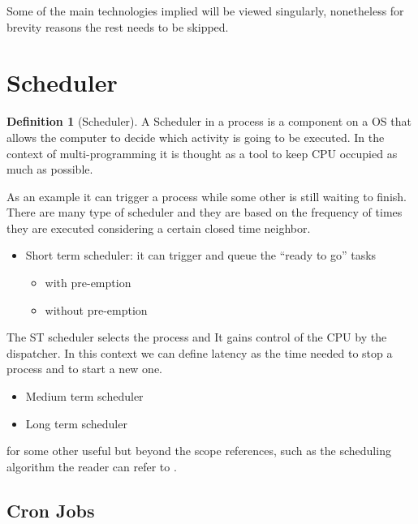\documentclass[
  12pt,
  a4paper,
  oneside]{book}
\providecommand{\tightlist}{%
  \setlength{\itemsep}{0pt}\setlength{\parskip}{0pt}}
\theoremstyle{definition}
\newtheorem{definition}{Definition}[chapter]
\theoremstyle{definition}
\theoremstyle{definition}
\theoremstyle{remark}
\begin{document}
Some of the main technologies implied will be viewed singularly, nonetheless for brevity reasons the rest needs to be skipped.

\hypertarget{scheduler}{%
\section{Scheduler}\label{scheduler}}

\begin{definition}[Scheduler]
\protect\hypertarget{def:scheduler}{}{\label{def:scheduler} {} }A Scheduler in a process is a component on a OS that allows the computer to decide which activity is going to be executed. In the context of multi-programming it is thought as a tool to keep CPU occupied as much as possible.
\end{definition}

As an example it can trigger a process while some other is still waiting to finish. There are many type of scheduler and they are based on the frequency of times they are executed considering a certain closed time neighbor.

\begin{itemize}
\tightlist
\item
  Short term scheduler: it can trigger and queue the ``ready to go'' tasks

  \begin{itemize}
  \tightlist
  \item
    with pre-emption
  \item
    without pre-emption
  \end{itemize}
\end{itemize}

The ST scheduler selects the process and It gains control of the CPU by the dispatcher. In this context we can define latency as the time needed to stop a process and to start a new one.

\begin{itemize}
\tightlist
\item
  Medium term scheduler
\item
  Long term scheduler
\end{itemize}

for some other useful but beyond the scope references, such as the scheduling algorithm the reader can refer to \citep{wiki:scheduler}.

\hypertarget{cron-jobs}{%
\subsection{Cron Jobs}\label{cron-jobs}}
\end{document}
